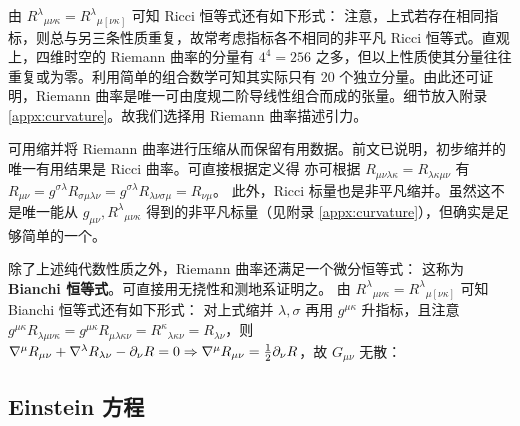 由 ${R^\lambda}_{\mu\nu\kappa}={R^\lambda}_{\mu[\nu\kappa]}$ 可知 Ricci 恒等式还有如下形式：
注意，上式若存在相同指标，则总与另三条性质重复，故常考虑指标各不相同的非平凡 Ricci 恒等式。直观上，四维时空的 Riemann 曲率的分量有 $4^4=256$ 之多，但以上性质使其分量往往重复或为零。利用简单的组合数学可知其实际只有 20 个独立分量。由此还可证明，Riemann 曲率是唯一可由度规二阶导线性组合而成的张量。细节放入附录 \ref{appx:curvature}。故我们选择用 Riemann 曲率描述引力。

可用缩并将 Riemann 曲率进行压缩从而保留有用数据。前文已说明，初步缩并的唯一有用结果是 Ricci 曲率。可直接根据定义得
亦可根据 $R_{\mu\nu\lambda\kappa}=R_{\lambda\kappa\mu\nu}$ 有 $R_{\mu\nu}=g^{\sigma\lambda}R_{\sigma\mu\lambda\nu}=g^{\sigma\lambda}R_{\lambda\nu\sigma\mu}=R_{\nu\mu}$。
此外，Ricci 标量也是非平凡缩并。虽然这不是唯一能从 $g_{\mu\nu},R^\lambda{}_{\mu\nu\kappa}$ 得到的非平凡标量（见附录 \ref{appx:curvature}），但确实是足够简单的一个。

除了上述纯代数性质之外，Riemann 曲率还满足一个微分恒等式：
这称为\textbf{Bianchi 恒等式}。可直接用无挠性和测地系证明之。
由 ${R^\lambda}_{\mu\nu\kappa}={R^\lambda}_{\mu[\nu\kappa]}$ 可知 Bianchi 恒等式还有如下形式：
对上式缩并 $\lambda,\sigma$ 再用 $g^{\mu\kappa}$ 升指标，且注意 $g^{\mu\kappa} R_{\lambda \mu\nu\kappa}=g^{\mu\kappa} R_{\mu\lambda\kappa \nu}=R^{\kappa}{}_{\lambda\kappa \nu}=R_{\lambda\nu}$，则 $\nabla^{\mu} R_{\mu\nu}+ \nabla^\lambda R_{\lambda\nu}-\partial_\nu R=0\Rightarrow\nabla^{\mu} R_{\mu\nu}=\frac 12\partial_\nu R$，故 $G_{\mu\nu}$ 无散：

\subsection{Einstein 方程}

